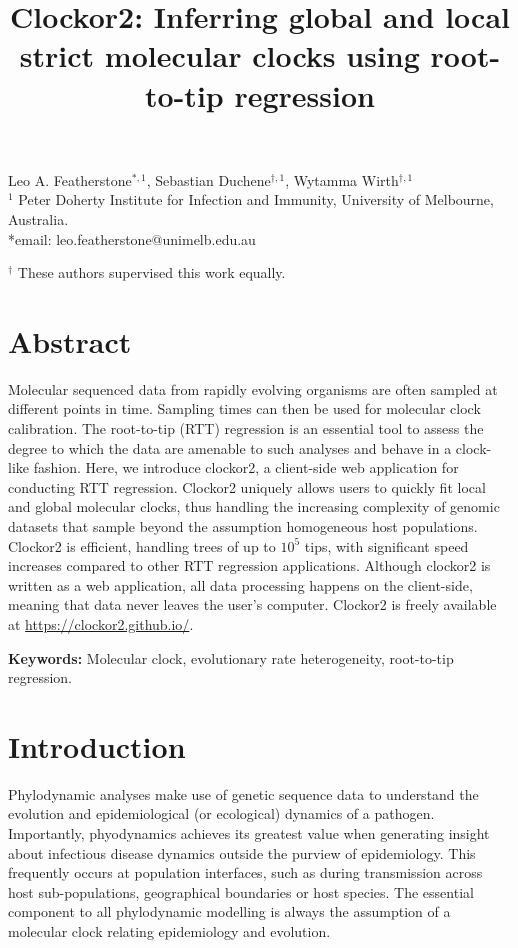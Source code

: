 \documentclass{article}
\title{Clockor2:  Inferring global and local strict molecular clocks using root-to-tip regression}
\begin{document}
\maketitle
\begin{centering}
Leo A. Featherstone$^{\ast,1}$, Sebastian Duchene$^{\dagger,1}$, Wytamma Wirth$^{\dagger,1}$\\
$^{1}$ Peter Doherty Institute for Infection and Immunity, University of Melbourne, Australia.\\

*email: leo.featherstone@unimelb.edu.au
\end{centering}

$^{\dagger}$ These authors supervised this work equally.


\section*{Abstract}
Molecular sequenced data from rapidly evolving organisms are often sampled at different points in time. Sampling times can then be used for molecular clock calibration. The root-to-tip (RTT) regression is an essential tool to assess the degree to which the data are amenable to such analyses and behave in a clock-like fashion. Here, we introduce clockor2, a client-side web application for conducting RTT regression. Clockor2 uniquely allows users to quickly fit local and global molecular clocks, thus handling the increasing complexity of genomic datasets that sample beyond the assumption homogeneous host populations. Clockor2 is efficient, handling trees of up to $10^5$ tips, with significant speed increases compared to other RTT regression applications. Although clockor2 is written as a web application, all data processing happens on the client-side, meaning that data never leaves the user's computer. Clockor2 is freely available at \url{https://clockor2.github.io/}.

\textbf{Keywords:} Molecular clock, evolutionary rate heterogeneity, root-to-tip regression.

\section*{Introduction}
Phylodynamic analyses make use of genetic sequence data to understand the evolution and epidemiological (or ecological) dynamics of a pathogen. Importantly, phyodynamics achieves its greatest value when generating insight about infectious disease dynamics outside the purview of epidemiology. This frequently occurs at population interfaces, such as during transmission across host sub-populations,  geographical boundaries or host species. The essential component to all phylodynamic modelling is always the assumption of a molecular clock relating epidemiology and evolution.
\end{document}
